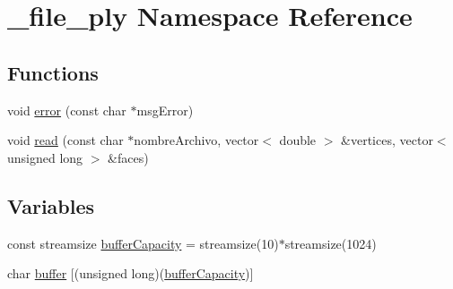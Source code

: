 \hypertarget{namespace__file__ply}{\section{\+\_\+file\+\_\+ply Namespace Reference}
\label{namespace__file__ply}
}
\subsection*{Functions}
\begin{DoxyCompactItemize}
\item 
void \hyperlink{namespace__file__ply_a1da8b0ac0e1febd8984cfbf7b9f3c682}{error} (const char $\ast$msg\+Error)
\item 
void \hyperlink{namespace__file__ply_a4958ec9c225bd88927de9ba6115810a9}{read} (const char $\ast$nombre\+Archivo, vector$<$ double $>$ \&vertices, vector$<$ unsigned long $>$ \&faces)
\end{DoxyCompactItemize}
\subsection*{Variables}
\begin{DoxyCompactItemize}
\item 
const streamsize \hyperlink{namespace__file__ply_a66e58e4b840d28ffd29b2d78360cc365}{buffer\+Capacity} = streamsize(10)$\ast$streamsize(1024)
\item 
char \hyperlink{namespace__file__ply_a0f387576a0c9b81853271b839973e850}{buffer} \mbox{[}(unsigned long)(\hyperlink{namespace__file__ply_a66e58e4b840d28ffd29b2d78360cc365}{buffer\+Capacity})\mbox{]}
\end{DoxyCompactItemize}


